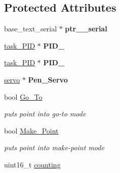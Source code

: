 \subsection*{Protected Attributes}
\begin{DoxyCompactItemize}
\item 
\hypertarget{classpoint_a0faaab9d77ce6901394cc600031dbd68}{base\-\_\-text\-\_\-serial $\ast$ {\bfseries ptr\-\_\-\_\-serial}}\label{classpoint_a0faaab9d77ce6901394cc600031dbd68}

\item 
\hypertarget{classpoint_a182d5d53e4670536ad7c33429d26d2fd}{\hyperlink{classtask__PID}{task\-\_\-\-P\-I\-D} $\ast$ {\bfseries P\-I\-D\-\_}}\label{classpoint_a182d5d53e4670536ad7c33429d26d2fd}

\item 
\hypertarget{classpoint_a044c64d033c5037d047e9e9284dbc0f6}{\hyperlink{classtask__PID}{task\-\_\-\-P\-I\-D} $\ast$ {\bfseries P\-I\-D\-\_}}\label{classpoint_a044c64d033c5037d047e9e9284dbc0f6}

\item 
\hypertarget{classpoint_a145a99706897943b3fd67e82bedfc67d}{\hyperlink{classservo}{servo} $\ast$ {\bfseries Pen\-\_\-\-Servo}}\label{classpoint_a145a99706897943b3fd67e82bedfc67d}

\item 
\hypertarget{classpoint_af084bab290868a439d2e50d8bec319f8}{bool \hyperlink{classpoint_af084bab290868a439d2e50d8bec319f8}{Go\-\_\-\-To}}\label{classpoint_af084bab290868a439d2e50d8bec319f8}

\begin{DoxyCompactList}\small\item\em puts point into go-\/to mode \end{DoxyCompactList}\item 
\hypertarget{classpoint_aa1887ba10c33201b950564eeeb41ebef}{bool \hyperlink{classpoint_aa1887ba10c33201b950564eeeb41ebef}{Make\-\_\-\-Point}}\label{classpoint_aa1887ba10c33201b950564eeeb41ebef}

\begin{DoxyCompactList}\small\item\em puts point into make-\/point mode \end{DoxyCompactList}\item 
\hypertarget{classpoint_af919b0d5580bbcc3997ec66880fb69e9}{uint16\-\_\-t \hyperlink{classpoint_af919b0d5580bbcc3997ec66880fb69e9}{counting}}\label{classpoint_af919b0d5580bbcc3997ec66880fb69e9}


\end{DoxyCompactItemize}
